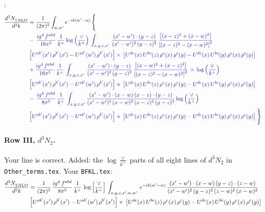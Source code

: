\documentclass[10pt]{article}
\numberwithin{equation}{section}
\newcommand{\new}[1]{{\color{blue}#1}}
\newcommand{\nc}{\color{blue}}
\begin{document}
\noindent \new{From \texttt{Other\_terms.tex}}:
\begin{align}
   \frac{d^{3}N_{1\,\rm NLO}^{\rm}}{d^{3}k}  & =  \frac{1}{(2\pi)^{3}}  \int_{w, w^\prime} e^{-ik(w^\prime-w)}\, \Bigg\{\notag \\
& \nc  -\,\frac{ig^{4}\,f^{abd}}{16\pi^{5}}\,\frac{1}{k^{+}}\, \new{\log{\left(\frac{\vee}{k^{+}}\right)}}\,\int_{x,y,z,x'}\, \frac{(x'-w')\cdot (y-z)}{(x'-w')^{2}\,(y-z)^{2}}\,\frac{\left[(x-z)^{2}+(x-w)^{2}\right]}{\left[(x-z)^{2}-(x-w)^{2}\right]^{2}}\notag \\ & \nc  \left[U^{ab'}(x')\,\rho^{b'}(x')-U^{ab'}(w')\, \rho^{b'}(x')\right]\times\, \left[U^{de}(x)\,U^{bc}(z)\, \rho^{e}(x)\,\rho^{c}(y)-U^{de}(x)\,U^{bc}(y)\,\rho^{e}(x)\,\rho^{c}(y)\right] \notag \\
& \nc   +\frac{ig^{4}\,f^{abd}}{16\pi^{5}}\, \frac{1}{k^{+}}\,\int_{x,y,z,x'}\, \frac{(x'-w')\cdot (y-z)}{(x'-w')^{2}\,(y-z)^{2}}\, \frac{\left[(x-w)^{2}+(x-z)^{2}\right]}{\left[(x-z)^{2}-(x-w)^{2}\right]^{2}}\, \times\, \new{\log{\left(\frac{\vee}{k^{+}}\right)}}\notag \\ & \nc  \left[U^{ab'}(x')\,\rho^{b'}(x')-U^{ab'}(w')\, \rho^{b'}(x')\right]\times\, \left[U^{de}(x)\,U^{bc}(z)\, \rho^{e}(x)\,\rho^{c}(y)-U^{de}(x)\,U^{bc}(y)\,\rho^{e}(x)\,\rho^{c}(y)\right] \notag \\
& \nc  -\, \frac{ig^{4}\,f^{abd}}{8\pi^{5}}\,\frac{1}{k^{+}}\,\int_{x,y,z,x'}\frac{(x'-w')\cdot (x-w)\, (x-z)\cdot (y-z)}{(x'-w')^{2}\, (x-w)^{2}\, (x-z)^{2}\, (y-z)^{2}}\,\new{\log{\left(\frac{\vee}{k^{+}}\right)}} \notag \\ & \nc  \left[U^{ab'}(x')\,\rho^{b'}(x')-U^{ab'}(w')\, \rho^{b'}(x')\right]\times\, \left[U^{de}(x)\,U^{bc}(z)\, \rho^{e}(x)\,\rho^{c}(y)-U^{de}(x)\,U^{bc}(y)\,\rho^{e}(x)\,\rho^{c}(y)\right]\Bigg\} \label{eq:Bnew:G1IIIN1}
\end{align}

\paragraph{Row III, $d^3N_2$.}
Your line is correct. \new{Added}: the $\log\frac{\vee}{k^+}$ parts of all eight lines of $d^3N_2$ in \texttt{Other\_terms.tex}.
\noindent Your \texttt{BFKL.tex}:
\begin{align}
   \frac{d^{3}N_{2\,\rm NLO}^{\rm}}{d^{3}k}  & =  \frac{1}{(2\pi)^{3}} \,\frac{ig^{4}\, f^{abd}}{8\pi^{5}}\, \frac{1}{k^{+}}\, \log{\left[\frac{\vee}{ k^{+}}\right]}\,\int_{x,y,z,x',w,w'}\,e^{-ik(w^\prime-w)}\,\frac{(x'-w')\cdot (x-w)\, (y-z)\cdot (z-w)}{(x'-w')^{2}\, (y-z)^{2}\, (z-w)^{2}\,(x-w)^{2}}\, \notag \\ & \left[U^{ab'}(x')\,\rho^{b'}(x')-U^{ab'}(w')\, \rho^{b'}(x')\right]\times\,\left[U^{de}(x)\,U^{bc}(z)\, \rho^{e}(x)\,\rho^{c}(y)-U^{de}(x)\,U^{bc}(y)\,\rho^{e}(x)\,\rho^{c}(y)\right] \label{eq:Byour:G1IIIN2}
\end{align}
\end{document}
